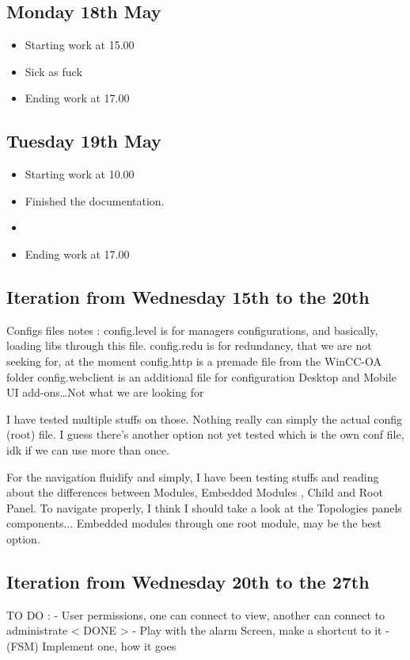 \documentclass[a4paper, 10pt]{article}
\begin{document}
\subsection*{Monday 18th May}
\begin{itemize}
    \item Starting work at 15.00
    \item Sick as fuck
    \item Ending work at 17.00
\end{itemize}

\subsection*{Tuesday 19th May}
\begin{itemize}
    \item Starting work at 10.00
    \item Finished the documentation.
    \item 
    \item Ending work at 17.00
\end{itemize}

\subsection{Iteration from Wednesday 15th to the 20th}

Configs files notes : 
config.level is for managers configurations, and basically, loading libs through this file.
config.redu is for redundancy, that we are not seeking for, at the moment
config.http is a premade file from the WinCC-OA folder
config.webclient is an additional file for configuration Desktop and Mobile UI add-ons\dots Not what we are looking for

I have tested multiple stuffs on those. Nothing really can simply the actual config (root) file.
I guess there's another option not yet tested which is the own conf file, idk if we can use more than once.

For the navigation fluidify and simply, I have been testing stuffs and reading about the differences between Modules, Embedded Modules , Child and Root Panel.
To navigate properly, I think I should take a look at the Topologies panels components...
Embedded modules through one root module, may be the best option.

\subsection{Iteration from Wednesday 20th to the 27th}
TO DO : - User permissions, one can connect to view, another can connect to administrate < DONE >
        - Play with the alarm Screen, make a shortcut to it
        - (FSM) Implement one, how it goes
\end{document}
